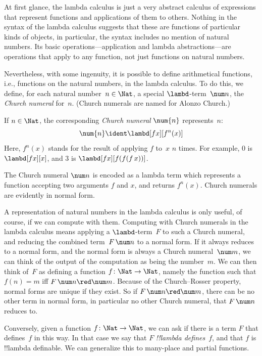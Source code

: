 \documentclass[../../../include/open-logic-section]{subfiles}
\begin{document}

At first glance, the lambda calculus is just a very abstract calculus
of expressions that represent functions and applications of them to
others. Nothing in the syntax of the lambda calculus suggests that
these are functions of particular kinds of objects, in particular, the
syntax includes no mention of natural numbers. Its basic
operations---application and lambda abstractions---are operations that
apply to any function, not just functions on natural
numbers.

Nevertheless, with some ingenuity, it is possible to define
arithmetical functions, i.e., functions on the natural numbers, in the
lambda calculus. To do this, we define, for each natural number~$n \in
\Nat$, a special $\lambd$-term~$\num n$, the \emph{Church numeral}
for~$n$. (Church numerals are named for Alonzo Church.)

\begin{defn}
  If $n \in \Nat$, the corresponding \emph{Church numeral} $\num{n}$
  represents~$n$:
  \[
    \num{n} \ident \lambd[fx][f^n(x)]
  \]
  Here, $f^n(x)$ stands for the result of applying $f$ to~$x$ $n$
  times. For example, $\num{0}$ is $\lambd[fx][x]$, and $\num{3}$ is
  $\lambd[fx][f(f(f\,x))]$.
\end{defn}
  
The Church numeral $\num n$ is encoded as a lambda term which
represents a function accepting two arguments $f$ and $x$, and
returns $f^n(x)$. Church numerals are evidently in normal form.

A representation of natural numbers in the lambda calculus is only
useful, of course, if we can compute with them.  Computing with Church
numerals in the lambda calculus means applying a $\lambd$-term~$F$ to
such a Church numeral, and reducing the combined term~$F\, \num n$ to
a normal form. If it always reduces to a normal form, and the normal
form is always a Church numeral~$\num m$, we can think of the output
of the computation as being the number~$m$. We can then think of~$F$
as defining a function $f\colon \Nat \to \Nat$, namely the function
such that $f(n) = m$ iff $F\, \num n \red \num m$. Because of the
Church--Rosser property, normal forms are unique if they exist. So if
$F\, \num n \red \num m$, there can be no other term in normal form,
in particular no other Church numeral, that $F \, \num n$ reduces to.

Conversely, given a function $f\colon \Nat \to \Nat$,
we can ask if there is a term $F$ that defines~$f$ in this way. In
that case we say that $F$ \emph{!!{lambda define}s}~$f$, and that $f$ is
!!{lambda definable}. We can generalize this to many-place and partial
functions.
\end{document}
